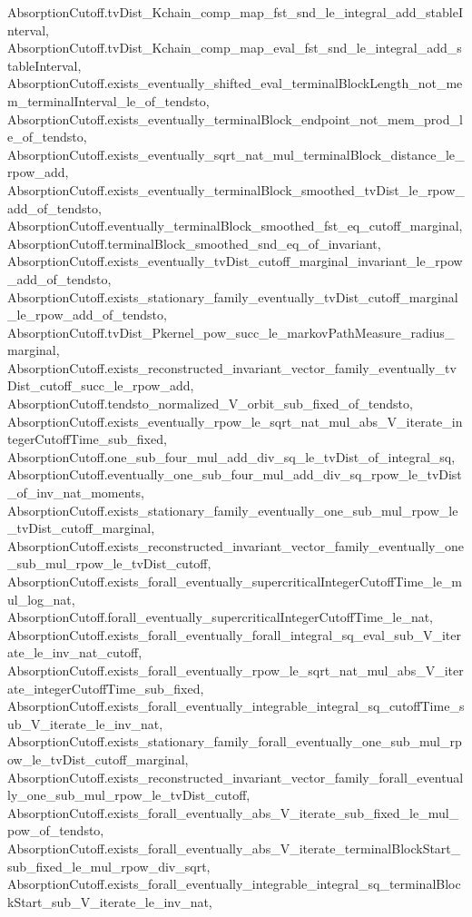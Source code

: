 \begin{lemma}
{    AbsorptionCutoff.tvDist_Kchain_comp_map_fst_snd_le_integral_add_stableInterval,
    AbsorptionCutoff.tvDist_Kchain_comp_map_eval_fst_snd_le_integral_add_stableInterval,
    AbsorptionCutoff.exists_eventually_shifted_eval_terminalBlockLength_not_mem_terminalInterval_le_of_tendsto,
    AbsorptionCutoff.exists_eventually_terminalBlock_endpoint_not_mem_prod_le_of_tendsto,
    AbsorptionCutoff.exists_eventually_sqrt_nat_mul_terminalBlock_distance_le_rpow_add,
    AbsorptionCutoff.exists_eventually_terminalBlock_smoothed_tvDist_le_rpow_add_of_tendsto,
    AbsorptionCutoff.eventually_terminalBlock_smoothed_fst_eq_cutoff_marginal,
    AbsorptionCutoff.terminalBlock_smoothed_snd_eq_of_invariant,
    AbsorptionCutoff.exists_eventually_tvDist_cutoff_marginal_invariant_le_rpow_add_of_tendsto,
    AbsorptionCutoff.exists_stationary_family_eventually_tvDist_cutoff_marginal_le_rpow_add_of_tendsto,
    AbsorptionCutoff.tvDist_Pkernel_pow_succ_le_markovPathMeasure_radius_marginal,
    AbsorptionCutoff.exists_reconstructed_invariant_vector_family_eventually_tvDist_cutoff_succ_le_rpow_add,
    AbsorptionCutoff.tendsto_normalized_V_orbit_sub_fixed_of_tendsto,
    AbsorptionCutoff.exists_eventually_rpow_le_sqrt_nat_mul_abs_V_iterate_integerCutoffTime_sub_fixed,
    AbsorptionCutoff.one_sub_four_mul_add_div_sq_le_tvDist_of_integral_sq,
    AbsorptionCutoff.eventually_one_sub_four_mul_add_div_sq_rpow_le_tvDist_of_inv_nat_moments,
    AbsorptionCutoff.exists_stationary_family_eventually_one_sub_mul_rpow_le_tvDist_cutoff_marginal,
    AbsorptionCutoff.exists_reconstructed_invariant_vector_family_eventually_one_sub_mul_rpow_le_tvDist_cutoff,
    AbsorptionCutoff.exists_forall_eventually_supercriticalIntegerCutoffTime_le_mul_log_nat,
    AbsorptionCutoff.forall_eventually_supercriticalIntegerCutoffTime_le_nat,
    AbsorptionCutoff.exists_forall_eventually_forall_integral_sq_eval_sub_V_iterate_le_inv_nat_cutoff,
    AbsorptionCutoff.exists_forall_eventually_rpow_le_sqrt_nat_mul_abs_V_iterate_integerCutoffTime_sub_fixed,
    AbsorptionCutoff.exists_forall_eventually_integrable_integral_sq_cutoffTime_sub_V_iterate_le_inv_nat,
    AbsorptionCutoff.exists_stationary_family_forall_eventually_one_sub_mul_rpow_le_tvDist_cutoff_marginal,
    AbsorptionCutoff.exists_reconstructed_invariant_vector_family_forall_eventually_one_sub_mul_rpow_le_tvDist_cutoff,
    AbsorptionCutoff.exists_forall_eventually_abs_V_iterate_sub_fixed_le_mul_pow_of_tendsto,
    AbsorptionCutoff.exists_forall_eventually_abs_V_iterate_terminalBlockStart_sub_fixed_le_mul_rpow_div_sqrt,
    AbsorptionCutoff.exists_forall_eventually_integrable_integral_sq_terminalBlockStart_sub_V_iterate_le_inv_nat,
}
\end{lemma}
